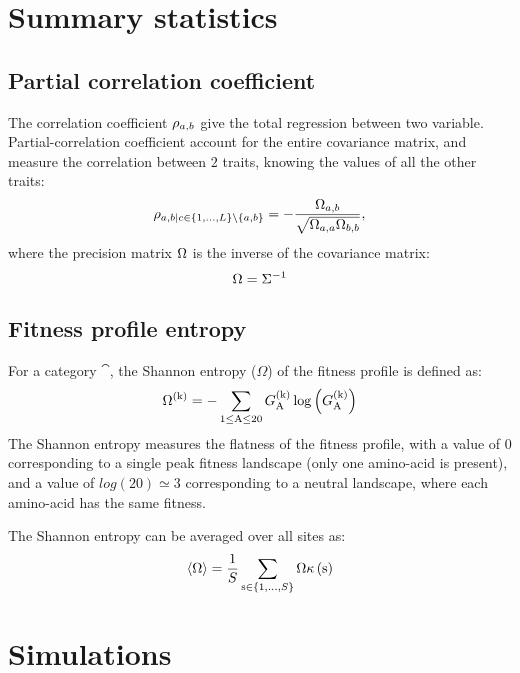\section{Summary statistics}

\subsection{Partial correlation coefficient}

The correlation coefficient $\rho_{a, b}$ give the total regression between two variable.
Partial-correlation coefficient account for the entire covariance matrix, and measure the correlation between $2$ traits, knowing the values of all the other traits:
\begin{equation}
    \rho_{a, b | c \in \{1, \hdots, L\} \setminus \{ a, b\} } = - \dfrac{\Omega_{a, b}}{\sqrt{\Omega_{a, a} \Omega_{b, b}}},
\end{equation}
where the precision matrix $\Omega$ is the inverse of the covariance matrix:
\begin{equation}
    \Omega = \Sigma^{-1}
\end{equation}

\subsection{Fitness profile entropy}
For a category $\cat$, the Shannon entropy ($\Omega$) of the fitness profile is defined as:
\begin{equation}
    \Omega^{(\text{k})} = - \sum_{1 \leq \text{A} \leq 20} G^{(\text{k})}_{\text{A}} \log \left( G^{(\text{k})}_{\text{A}} \right)
\end{equation}
The Shannon entropy measures the flatness of the fitness profile, with a value of $0$ corresponding to a single peak fitness landscape (only one amino-acid is present), and a value of $log(20)\simeq3$ corresponding to a \gls{neutral} landscape, where each amino-acid has the same fitness.

The Shannon entropy can be averaged over all sites as:
\begin{equation}
    \langle \Omega \rangle = \dfrac{1}{S}\sum_{\text{s} \in \{1, \hdots, S\}} \Omega\kappa\left(\text{s}\right)
\end{equation}


\section{Simulations}

